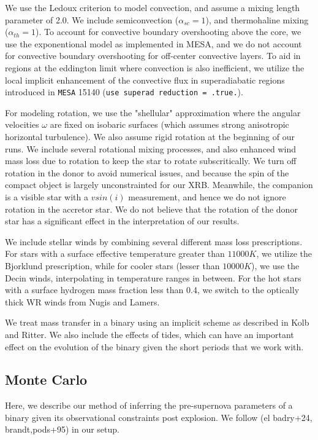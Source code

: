 \documentclass[linenumbers,trackchanges,twocolumn]{aastex701}
\begin{document}
We use the Ledoux criterion to model convection, and assume a mixing length parameter of 2.0. We include semiconvection ($\alpha_{sc}=1$), and thermohaline mixing ($\alpha_{th}=1$). To account for convective boundary overshooting above the core, we use the exponentional model as implemented in MESA, and we do not account for convective boundary overshooting for off-center convective layers. To aid in regions at the eddington limit where convection is also inefficient, we utilize the local implicit enhancement of the convective flux in superadiabatic regions introduced in \texttt{MESA} 15140 (\texttt{use superad reduction = .true.}).

For modeling rotation, we use the "shellular" approximation where the angular velocities $\omega$ are fixed on isobaric surfaces (which assumes strong anisotropic horizontal turbulence). We also assume rigid rotation at the beginning of our runs. We include several rotational mixing processes, and also enhanced wind mass loss due to rotation to keep the star to rotate subscritically. We turn off rotation in the donor to avoid numerical issues, and because the spin of the compact object is largely unconstrainted for our XRB. Meanwhile, the companion is a visible star with a $vsin(i)$ measurement, and hence we do not ignore rotation in the accretor star. We do not believe that the rotation of the donor star has a significant effect in the interpretation of our results. 

We include stellar winds by combining several different mass loss prescriptions. For stars with a surface effective temperature greater than $11000K$, we utilize the Bjorklund prescription, while for cooler stars (lesser than $10000K$), we use the Decin winds, interpolating in temperature ranges in between. For the hot stars with a surface hydrogen mass fraction less than 0.4, we switch to the optically thick WR winds from Nugis and Lamers.

We treat mass transfer in a binary using an implicit scheme as described in Kolb and Ritter. We also include the effects of tides, which can have an important effect on the evolution of the binary given the short periods that we work with. 

\subsection{Monte Carlo}

Here, we describe our method of inferring the pre-supernova parameters of a binary given its observational constraints post explosion. We follow (el badry+24, brandt,pods+95) in our setup. 
\end{document}
